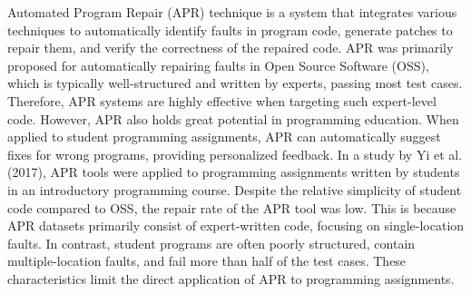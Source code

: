 \documentclass[10pt,conference]{IEEEtran}
\begin{document}
    Automated Program Repair (APR) technique is a system that integrates various techniques to automatically identify faults in program code, generate patches to repair them, and verify the correctness of the repaired code. APR was primarily proposed for automatically repairing faults in Open Source Software (OSS), which is typically well-structured and written by experts, passing most test cases. Therefore, APR systems are highly effective when targeting such expert-level code. However, APR also holds great potential in programming education. When applied to student programming assignments, APR can automatically suggest fixes for wrong programs, providing personalized feedback. In a study by Yi et al. (2017)\cite{yi2017feasibility}, APR tools \cite{le2011genprog, weimer2013leveraging, mechtaev2016angelix, long2016automatic} were applied to programming assignments written by students in an introductory programming course. Despite the relative simplicity of student code compared to OSS, the repair rate of the APR tool was low. This is because APR datasets primarily consist of expert-written code, focusing on single-location faults. In contrast, student programs are often poorly structured, contain multiple-location faults, and fail more than half of the test cases\cite{yi2017feasibility}. These characteristics limit the direct application of APR to programming assignments.
\end{document}
